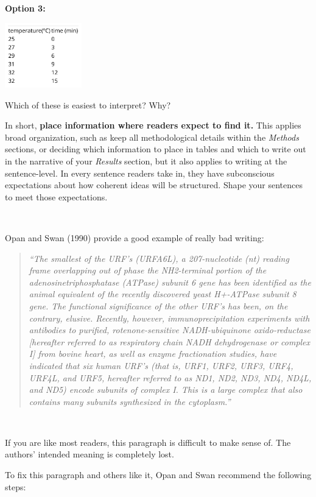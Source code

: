\documentclass[]{book}
\begin{document}
\textbf{Option 3:}

\includegraphics[width=0.25\textwidth,height=\textheight]{img/style-eg2.png}

Which of these is easiest to interpret? Why?

In short, \textbf{place information where readers expect to find it.} This applies broad organization, such as keep all methodological details within the \emph{Methods} sections, or deciding which information to place in tables and which to write out in the narrative of your \emph{Results} section, but it also applies to writing at the sentence-level. In every sentence readers take in, they have subconscious expectations about how coherent ideas will be structured. Shape your sentences to meet those expectations.

~

Opan and Swan (1990) provide a good example of really bad writing:

\begin{quote}
\emph{``The smallest of the URF's (URFA6L), a 207-nucleotide (nt) reading frame overlapping out of phase the NH2-terminal portion of the adenosinetriphosphatase (ATPase) subunit 6 gene has been identified as the animal equivalent of the recently discovered yeast H+-ATPase subunit 8 gene. The functional significance of the other URF's has been, on the contrary, elusive. Recently, however, immunoprecipitation experiments with antibodies to purified, rotenone-sensitive NADH-ubiquinone oxido-reductase {[}hereafter referred to as respiratory chain NADH dehydrogenase or complex I{]} from bovine heart, as well as enzyme fractionation studies, have indicated that six human URF's (that is, URF1, URF2, URF3, URF4, URF4L, and URF5, hereafter referred to as ND1, ND2, ND3, ND4, ND4L, and ND5) encode subunits of complex I. This is a large complex that also contains many subunits synthesized in the cytoplasm.''}
\end{quote}

~

If you are like most readers, this paragraph is difficult to make sense of. The authors' intended meaning is completely lost.

To fix this paragraph and others like it, Opan and Swan recommend the following steps:
\end{document}
